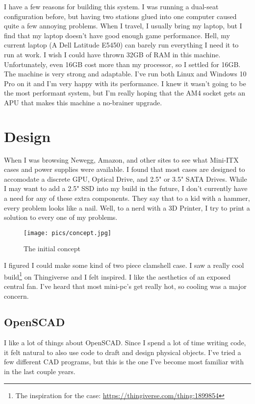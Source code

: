 \documentclass{article}
\begin{document}
I have a few reasons for building this system. I was running a dual-seat configuration before, but having two stations glued into one computer caused quite a few annoying problems. When I travel, I usually bring my laptop, but I find that my laptop doesn't have good enough game performance. Hell, my current laptop (A Dell Latitude E5450) can barely run everything I need it to run at work.
I wish I could have thrown 32GB of RAM in this machine. Unfortunately, even 16GB cost more than my processor, so I settled for 16GB. The machine is very strong and adaptable. I've run both Linux and Windows 10 Pro on it and I'm very happy with its  performance. I knew it wasn't going to be the most performant system, but I'm really hoping that the AM4 socket gets an APU that makes this machine a no-brainer upgrade. 

\section{Design}
When I was browsing Newegg, Amazon, and other sites to see what Mini-ITX cases and power supplies were available. I found that most cases are designed to accomodate a discrete GPU, Optical Drive, and 2.5" or 3.5" SATA Drives. While I may want to add a 2.5" SSD into my build in the future, I don't currently have a need for any of these extra components. They say that to a kid with a hammer, every problem looks like a nail. Well, to a nerd with a 3D Printer, I try to print a solution to every one of my problems.
\begin{figure}[h]
\texttt{[image: pics/concept.jpg]}
\caption{The initial concept}
\end{figure}

I figured I could make some kind of two piece clamshell case. I saw a really cool build\footnote{The inspiration for the case: \url{https://thingiverse.com/thing:1899854}} on Thingiverse and I felt inspired. I like the aesthetics of an exposed central fan. I've heard that most mini-pc's get really hot, so cooling was a major concern.

\subsection{OpenSCAD}
I like a lot of things about OpenSCAD. Since I spend a lot of time writing code, it felt natural to also use code to draft and design physical objects. I've tried a few different CAD programs, but this is the one I've become most familiar with in the last couple years.
\end{document}
